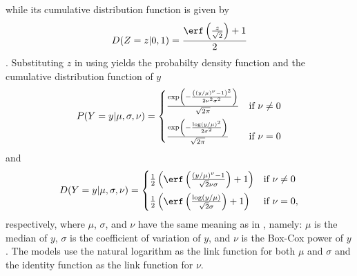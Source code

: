 while its cumulative distribution function is given by
\begin{equation}
  \label{eq:StandardNormalDistributionCDF}
  D(Z = z|0, 1) =
  \frac{\erf\left(\frac{z}{\sqrt{2}}\right) + 1}{2}
  \end{equation}
\parencite{Henze2013,Weisstein2017c}.  Substituting \(z\) in  using  yields the probabilty density function and the cumulative distribution function of \(y\)
\begin{equation}
  \label{eq:BoxCoxColeGreenDistributionPDF}
  P(Y = y|\mu, \sigma, \nu) =
  \begin{cases}
    \frac{\exp\left(-\frac{\left(\left(y \middle/ \mu\right)^\nu - 1\right)^2}{2 \nu^2 \sigma^2}\right)}{\sqrt{2 \pi}} &\text{if } \nu \not = 0 \vspace{0.5em} \\
    \frac{\exp\left(-\frac{\log\left(y \middle/ \mu\right)^2}{2 \sigma^2}\right)}{\sqrt{2 \pi}} &\text{if } \nu = 0
  \end{cases}
\end{equation}
and
\begin{equation}
  \label{eq:BoxCoxColeGreenDistributionCDF}
  D(Y = y|\mu, \sigma, \nu) =
  \begin{cases}
    \frac{1}{2} \left(\erf\left(\frac{\left( y \middle/ \mu \right)^\nu - 1}{\sqrt{2} \nu \sigma}\right) + 1\right) &\text{if } \nu \not = 0 \vspace{0.5em} \\
    \frac{1}{2} \left(\erf\left(\frac{\log\left( y \middle/ \mu \right)}{\sqrt{2} \sigma}\right) + 1\right) &\text{if } \nu = 0,
  \end{cases}
\end{equation}
respectively, where \(\mu\), \(\sigma\), and \(\nu\) have the same meaning as in , namely: \(\mu\) is the median of \(y\), \(\sigma\) is the coefficient of variation of \(y\), and \(\nu\) is the Box-Cox power of \(y\).  The models use the natural logarithm as the link function for both \(\mu\) and \(\sigma\) and the identity function as the link function for \(\nu\).

